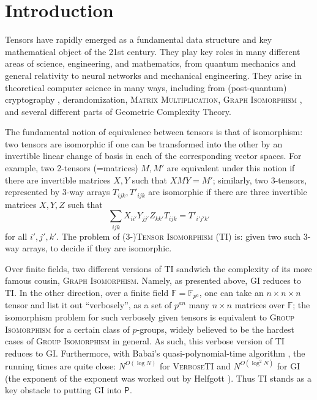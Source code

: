 \documentclass[10pt,a4paper]{article}
\theoremstyle{definition}
\newcommand{\F}{\mathbb{F}}
\begin{document}
\section{Introduction}
Tensors have rapidly emerged as a fundamental data structure and key mathematical object of the 21st century. They play key roles in many different areas of science, engineering, and mathematics, from quantum mechanics and general relativity to neural networks \cite{TNN} and mechanical engineering. They arise in theoretical computer science in many ways, including from (post-quantum) cryptography \cite{Pat96, JQSY19}, derandomization, \textsc{Matrix Multiplication}, \textsc{Graph Isomorphism} \cite{GQ}, and several different parts of Geometric Complexity Theory. 

The fundamental notion of equivalence between tensors is that of isomorphism: two tensors are isomorphic if one can be transformed into the other by an invertible linear change of basis in each of the corresponding vector spaces. For example, two 2-tensors (=matrices) $M,M'$ are equivalent under this notion if there are invertible matrices $X,Y$ such that $XMY = M'$; similarly, two 3-tensors, represented by 3-way arrays $T_{ijk}, T'_{ijk}$ are isomorphic if there are three invertible matrices $X,Y,Z$ such that 
\begin{equation} \label{eq:TI}
\sum_{ijk} X_{ii'} Y_{jj'} Z_{kk'} T_{ijk} = T'_{i'j'k'}
\end{equation}
for all $i',j',k'$. The problem of (3-)\textsc{Tensor Isomorphism} (\textsc{TI}) is: given two such 3-way arrays, to decide if they are isomorphic. 

Over finite fields, two different versions of \textsc{TI} sandwich the complexity of its more famous cousin, \textsc{Graph Isomorphism}. Namely, as presented above, \textsc{GI} reduces to \textsc{TI}. In the other direction, over a finite field $\F=\F_{p^a}$, one can take an $n \times n \times n$ tensor and list it out ``verbosely'', as a set of $p^{an}$ many $n \times n$ matrices over $\F$; the isomorphism problem for such verbosely given tensors is equivalent to \textsc{Group Isomorphism} for a certain class of $p$-groups, widely believed to be the hardest cases of \textsc{Group Isomorphism} in general. As such, this verbose version of \textsc{TI} reduces to \textsc{GI}. Furthermore, with Babai's quasi-polynomial-time algorithm \cite{Babai}, the running times are quite close: $N^{O(\log N)}$ for \textsc{VerboseTI} and $N^{O(\log^2 N)}$ for \textsc{GI} (the exponent of the exponent was worked out by Helfgott \cite{helfgott}). Thus \textsc{TI} stands as a key obstacle to putting \textsc{GI} into $\mathsf{P}$.
\end{document}

